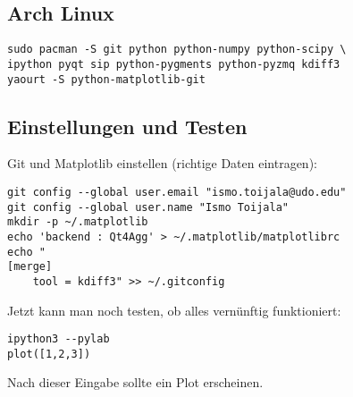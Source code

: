 \subsection{Arch Linux}
\begin{verbatim}
sudo pacman -S git python python-numpy python-scipy \
ipython pyqt sip python-pygments python-pyzmq kdiff3
yaourt -S python-matplotlib-git
\end{verbatim}

\subsection{Einstellungen und Testen}
\label{install-test}
Git und Matplotlib einstellen (richtige Daten eintragen):
\begin{verbatim}
git config --global user.email "ismo.toijala@udo.edu"
git config --global user.name "Ismo Toijala"
mkdir -p ~/.matplotlib
echo 'backend : Qt4Agg' > ~/.matplotlib/matplotlibrc
echo "
[merge]
    tool = kdiff3" >> ~/.gitconfig
\end{verbatim}
Jetzt kann man noch testen, ob alles vernünftig funktioniert:
\begin{verbatim}
ipython3 --pylab
plot([1,2,3])
\end{verbatim}
Nach dieser Eingabe sollte ein Plot erscheinen.
